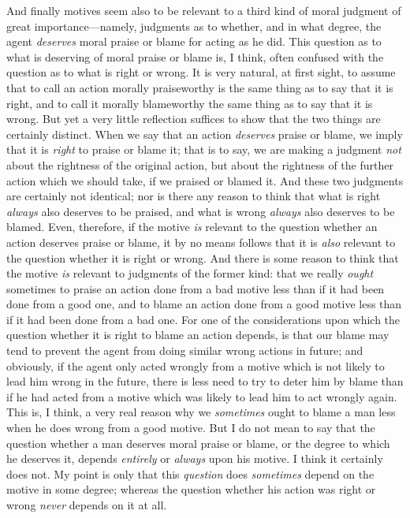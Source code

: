 And finally motives seem also to be relevant to a third kind of moral
judgment of great importance---namely, judgments as to whether, and in
what degree, the agent \textit{deserves} moral praise or blame for
acting as he did. This question as to what is deserving of moral
praise or blame is, I think, often confused with the question as to
what is right or wrong. It is very natural, at first sight, to assume
that to call an action morally praiseworthy is the same thing as to
say that it is right, and to call it morally blameworthy the same
thing as to say that it is  wrong. But yet a very little
reflection suffices to show that the two things are certainly
distinct. When we say that an action \textit{deserves} praise or
blame, we imply that it is \textit{right} to praise or blame it; that
is to say, we are making a judgment \textit{not} about the rightness
of the original action, but about the rightness of the further action
which we should take, if we praised or blamed it. And these two
judgments are certainly not identical; nor is there any reason to
think that what is right \textit{always} also deserves to be praised,
and what is wrong \textit{always} also deserves to be blamed. Even,
therefore, if the motive \textit{is} relevant to the question whether
an action deserves praise or blame, it by no means follows that it is
\textit{also} relevant to the question whether it is right or wrong.
And there is some reason to think that the motive \textit{is} relevant
to judgments of the former kind: that we really \textit{ought}
sometimes to praise an action done from a bad motive less than if it
had been done from a good one, and to blame an action done from a good
motive less than if it had been done from a bad one. For one of the
considerations upon which the question whether it is right to blame an
action depends,  is that our blame may tend to prevent the
agent from doing similar wrong actions in future; and obviously, if
the agent only acted wrongly from a motive which is not likely to lead
him wrong in the future, there is less need to try to deter him by
blame than if he had acted from a motive which was likely to lead him
to act wrongly again. This is, I think, a very real reason why we
\textit{sometimes} ought to blame a man less when he does wrong from a
good motive. But I do not mean to say that the question whether a man
deserves moral praise or blame, or the degree to which he deserves it,
depends \textit{entirely} or \textit{always} upon his motive. I think
it certainly does not. My point is only that this \textit{question}
does \textit{sometimes} depend on the motive in some degree; whereas
the question whether his action was right or wrong \textit{never}
depends on it at all.

